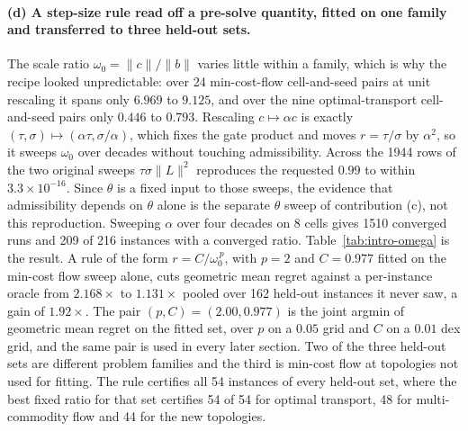 \paragraph{(d) A step-size rule read off a pre-solve quantity, fitted on one
family and transferred to three held-out sets.}
The scale ratio $\omega_0 = \|c\|/\|b\|$ varies little within a family, which
is why the recipe looked unpredictable: over 24 min-cost-flow cell-and-seed
pairs at unit rescaling it spans only $6.969$ to $9.125$, and over the nine
optimal-transport cell-and-seed pairs only $0.446$ to $0.793$.
Rescaling $c \mapsto \alpha c$ is exactly
$(\tau,\sigma) \mapsto (\alpha\tau, \sigma/\alpha)$, which fixes the gate
product and moves $r = \tau/\sigma$ by $\alpha^2$, so it sweeps $\omega_0$ over
decades without touching admissibility. Across the 1944 rows of the two
original sweeps $\tau\sigma\|L\|^2$ reproduces the requested $0.99$ to within
$3.3\times 10^{-16}$. Since $\theta$ is a fixed input to those sweeps, the
evidence that admissibility depends on $\theta$ alone is the separate $\theta$
sweep of contribution (c), not this reproduction. Sweeping $\alpha$ over four
decades on 8 cells gives 1510 converged runs and 209 of 216 instances with a
converged ratio.
Table~\ref{tab:intro-omega} is the result. A rule of the form
$r = C/\omega_0^{\,p}$, with $p = 2$ and $C = 0.977$ fitted on the min-cost
flow sweep alone, cuts geometric mean regret against a per-instance oracle from
$2.168\times$ to $1.131\times$ pooled over 162 held-out instances it never
saw, a gain of $1.92\times$. The pair $(p, C) = (2.00, 0.977)$ is the joint
argmin of geometric mean regret on the fitted set, over $p$ on a $0.05$ grid
and $C$ on a $0.01$ dex grid, and the same pair is used in every later section.
Two of the three held-out sets are different problem families and the third is
min-cost flow at topologies not used for fitting. The rule certifies all 54
instances of every held-out set, where the best fixed ratio for that set
certifies 54 of 54 for optimal transport, 48 for multi-commodity flow and 44
for the new topologies.

